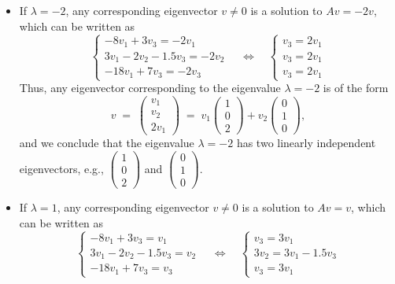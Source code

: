 \begin{itemize}
\item If $\lambda = -2$, any corresponding eigenvector $v \neq 0$ is a solution to
$Av = -2v$, which can be written as
\[
\begin{cases}
-8v_1+3v_3 = -2v_1\\
3v_1-2v_2-1.5v_3 = -2v_2\\
-18v_1+7v_3 = -2v_3
\end{cases}
\quad\Longleftrightarrow\quad
\begin{cases}
v_3 = 2v_1\\
v_3 = 2v_1\\
v_3 = 2v_1
\end{cases}
\]
Thus, any eigenvector corresponding to the eigenvalue $\lambda = -2$ is of the form
\[
v \;=\; \begin{pmatrix}v_1\\ v_2\\ 2v_1\end{pmatrix} \;=\;
v_1\begin{pmatrix}1\\0\\2\end{pmatrix} + v_2\begin{pmatrix}0\\1\\0\end{pmatrix},
\]
and we conclude that the eigenvalue $\lambda = -2$ has two linearly independent
eigenvectors, e.g., $\begin{pmatrix}1\\0\\2\end{pmatrix}$ and
$\begin{pmatrix}0\\1\\0\end{pmatrix}$.
\item If $\lambda = 1$, any corresponding eigenvector $v \neq 0$ is a solution to
$Av = v$, which can be written as
\[
\begin{cases}
-8v_1+3v_3 = v_1\\
3v_1-2v_2-1.5v_3 = v_2\\
-18v_1+7v_3 = v_3
\end{cases}
\quad\Longleftrightarrow\quad
\begin{cases}
v_3 = 3v_1\\
3v_2 = 3v_1 - 1.5v_3\\
v_3 = 3v_1
\end{cases}
\]
\end{itemize}
